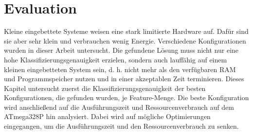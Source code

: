 \chapter{Evaluation}
Kleine eingebettete Systeme weisen eine stark limitierte Hardware auf. Dafür sind sie aber sehr klein und verbrauchen wenig Energie. Verschiedene Konfigurationen wurden in dieser Arbeit untersucht. Die gefundene
Lösung muss nicht nur eine hohe Klassifizierungsgenauigkeit erzielen, sondern auch lauffähig auf einem kleinen eingebetteten System sein, d. h. nicht mehr als den verfügbaren RAM und Programmspeicher nutzen und in
einer akzeptablen Zeit terminieren.
\newline
\newline
Dieses Kapitel untersucht zuerst die Klassifizierungsgenauigkeit der besten Konfigurationen, die gefunden wurden, je Feature-Menge. Die beste Konfiguration wird anschließend auf die Ausführungszeit
und Ressourcenverbrauch auf dem ATmega328P hin analysiert. Dabei wird auf mögliche Optimierungen eingegangen, um die Ausführungszeit und den Ressourcenverbrauch zu senken.



